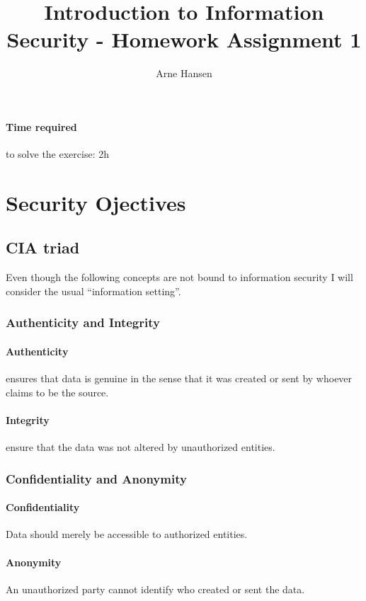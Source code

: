 \documentclass[12pt]{article}
\title{Introduction to Information Security - Homework Assignment 1}
\author{Arne Hansen}
\begin{document}
\maketitle

\paragraph{Time required} to solve the exercise: 2h

\section{Security Ojectives}


\subsection{CIA triad}
Even though the following concepts are not bound to information security I will consider the usual ``information setting''.
\subsubsection{Authenticity and Integrity}
\paragraph{Authenticity} %
\label{par:Authenticity}
ensures that data is genuine in the sense that it was created or sent by whoever claims to be the source.

\paragraph{Integrity} %
\label{par:Integrity}
ensure that the data was not altered by unauthorized entities.

\subsubsection{Confidentiality and Anonymity}

\paragraph{Confidentiality} %
\label{par:Confidentiality}
Data should merely be accessible to authorized entities. 

\paragraph{Anonymity} %
\label{par:Anonymity}
An unauthorized party cannot identify who created or sent the data.
\end{document}
